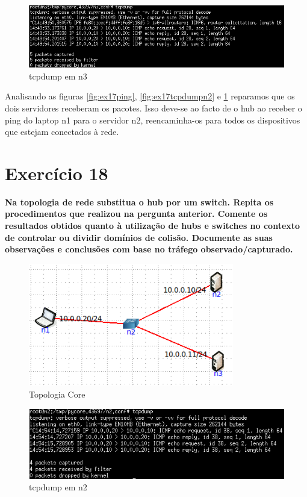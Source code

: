 \documentclass[a4paper]{report}
\begin{document}
\begin{figure}[H]
    \centering 
    \includegraphics[width=\textwidth]{images/ex17tcpdumpn3.png}
    \caption{tcpdump em n3}
    \label{fig:ex17tcpdumpn3}
\end{figure}
Analisando as figuras \ref{fig:ex17ping}, \ref{fig:ex17tcpdumpn2} e 
\ref{fig:ex17tcpdumpn3} reparamos que os dois servidores receberam os pacotes.
Isso deve-se ao facto de o hub ao receber o ping do laptop n1 para o servidor
n2, reencaminha-os para todos os dispositivos que estejam conectados à rede.

\section{Exercício 18}
\textbf{Na topologia de rede substitua o hub por um switch. Repita os
procedimentos que realizou na pergunta anterior. Comente os resultados obtidos
quanto à utilização de hubs e switches no contexto de controlar ou dividir
domínios de colisão. Documente as suas observações e conclusões com base no
tráfego observado/capturado.}

\begin{figure}[H]
    \centering 
    \includegraphics[width=0.8\textwidth]{images/ex18topologiacore.png}
    \caption{Topologia Core}
    \label{fig:ex18topologiacore}
\end{figure}

\begin{figure}[H]
    \centering 
    \includegraphics[width=\textwidth]{images/ex18tcpdumpn2.png}
    \caption{tcpdump em n2}
    \label{fig:ex18tcpdumpn2}
\end{figure}
\end{document}
